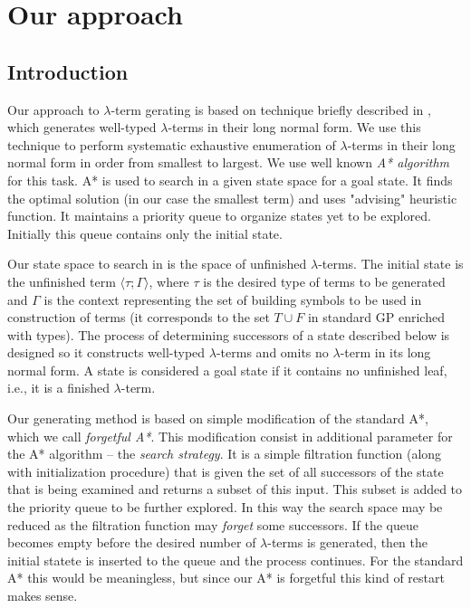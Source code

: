 \documentclass[conference]{IEEEtran}
\newcommand{\lterm}{$\lambda$-term\xspace}
\newcommand{\lterms}{$\lambda$-terms\xspace}
\newcommand{\ul}[2]{\langle #1 ; #2 \rangle}
\begin{document}
\section{Our approach}
\label{approach}

\subsection{Introduction}

Our approach to \lterm gerating is based on technique 
briefly described in \cite{barendregt10}, which generates
well-typed \lterms in their long normal form. 
We use this technique to perform systematic exhaustive enumeration
of \lterms in their long normal form in order from smallest to largest.
We use well known \textit{A* algorithm} \cite{AIMA} for this task.
A* is used to search in a given state space for a goal state. 
It finds the optimal solution (in our case the smallest term)
and uses "advising" heuristic function.
It maintains a priority queue to organize states yet to be explored.
Initially this queue contains only the initial state.  

Our state space to search in is the space of unfinished \lterms. 
The initial state is the unfinished term $\ul{\tau}{\Gamma}$, 
where $\tau$ is the desired type of
terms to be generated and $\Gamma$ is the context
representing the set of building symbols to be used in construction of
terms (it corresponds to the set $T \cup F$ in
standard GP enriched with types). The process of determining 
successors of a state described below is designed so it constructs well-typed 
\lterms and omits no \lterm in its long normal form. 
A state is considered a goal state if it contains no unfinished
leaf, i.e., it is a finished \lterm.

Our generating method is based on simple modification of the
standard A*, which we call \textit{forgetful A*}. This modification consist in 
additional parameter for the A* algorithm -- the \textit{search strategy}. 
It is a simple filtration function (along with initialization procedure)
that is given the set of all successors of the state that is being examined
and returns a subset of this input. This subset is added to the priority queue 
to be further explored. In this way the search space may be reduced as 
the filtration function may \textit{forget} some successors.
If the queue becomes empty before the desired number of \lterms
is generated, then the initial statete is inserted to the queue
and the process continues. For the standard A* this would be meaningless,
but since our A* is forgetful this kind of restart makes sense.
\end{document}
